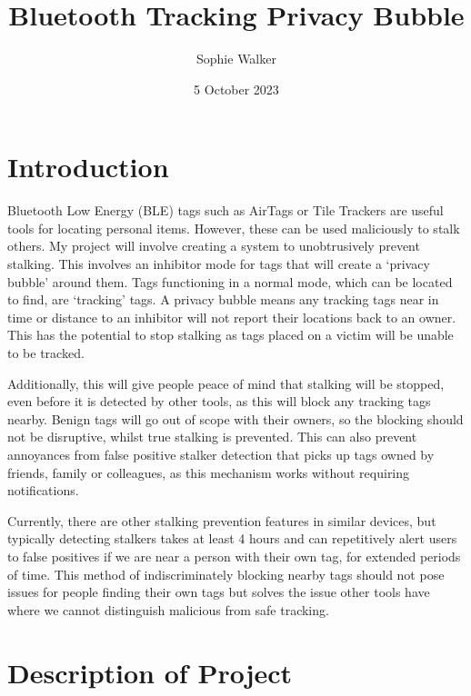 \documentclass{article}
\begin{document}
\title{Bluetooth Tracking Privacy Bubble}
\author{Sophie Walker}
\date{5 October 2023}
\maketitle
\thispagestyle{empty}
\section{Introduction}


Bluetooth Low Energy (BLE) tags such as AirTags or Tile Trackers are useful tools for locating personal items. However, these can be used maliciously to stalk others. My project will involve creating a system to unobtrusively prevent stalking. This involves an inhibitor mode for tags that will create a `privacy bubble' around them. Tags functioning in a normal mode, which can be located to find, are `tracking' tags. A privacy bubble means any tracking tags near in time or distance to an inhibitor will not report their locations back to an owner. This has the potential to stop stalking as tags placed on a victim will be unable to be tracked.
\par

Additionally, this will give people peace of mind that stalking will be stopped, even before it is detected by other tools, as this will block any tracking tags nearby. Benign tags will go out of scope with their owners, so the blocking should not be disruptive, whilst true stalking is prevented. This can also prevent annoyances from false positive stalker detection that picks up tags owned by friends, family or colleagues, as this mechanism works without requiring notifications.
\par
Currently, there are other stalking prevention features in similar devices, but typically detecting stalkers takes at least 4 hours \cite{Failuresof ASProtocols} and can repetitively alert users to false positives if we are near a person with their own tag, for extended periods of time. This method of indiscriminately blocking nearby tags should not pose issues for people finding their own tags but solves the issue other tools have where we cannot distinguish malicious from safe tracking.


\section{Description of Project}
\end{document}
